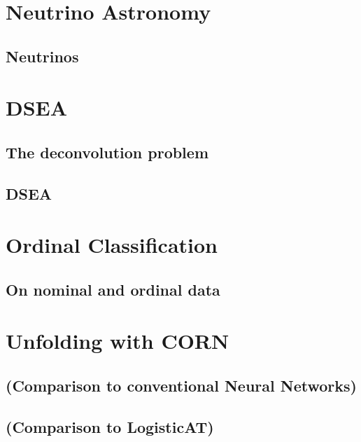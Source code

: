 
\chapter{Neutrino Astronomy}
  \section{Neutrinos}
  \blindtext[8]
  
\chapter{DSEA}
  \section{The deconvolution problem} %
  \blindtext[3]
  \section{DSEA} %
  \blindtext[10]
\chapter{Ordinal Classification}
  \section{On nominal and ordinal data}
  \blindtext[3]
  
\chapter{Unfolding with CORN}
  
  
  
  \section{(Comparison to conventional Neural Networks)}
  \section{(Comparison to LogisticAT)}


